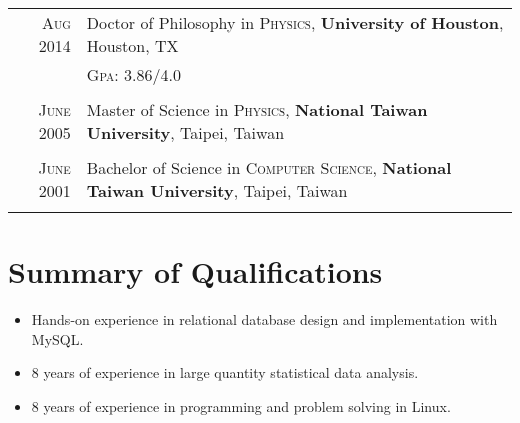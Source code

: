 \documentclass[11pt]{article} %
\begin{document}
\begin{tabular}{rl}
\textsc{Aug} 2014 & Doctor of Philosophy in \textsc{Physics}, \textbf{University of Houston}, Houston, TX\\
 &\normalsize \textsc{Gpa}: 3.86/4.0 \\%
&\\


\textsc{June} 2005 & Master of Science in \textsc{Physics}, \textbf{National Taiwan University}, Taipei, Taiwan \\
&\\


\textsc{June} 2001 & Bachelor of Science in \textsc{Computer Science}, \textbf{National Taiwan University}, Taipei, Taiwan\\
&\\


\end{tabular}



\section{Summary of Qualifications}
\begin{itemize}
	\item Hands-on experience in relational database design and implementation with MySQL.
  \item 8 years of experience in large quantity statistical data analysis.
  \item 8 years of experience in programming and problem solving in Linux.
\end{itemize}


\end{document}
